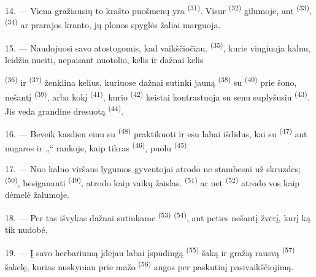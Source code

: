 14. --- Viena gražiausių to krašto puošmenų yra  \textsuperscript{(31)}.
Visur  \textsuperscript{(32)} gilumoje, ant 
\textsuperscript{(33)},  \textsuperscript{(34)} ar prarajos kranto, jų
plonos spyglės žaliai marguoja.

\VUsaut{3.0mm}
\VUsaut{3.0mm}

15. --- Naudojuosi savo atostogomis, kad  vaikščiočiau.
 \textsuperscript{(35)}, kurie vingiuoja kalnu, leidžia nueiti,
nepaisant nuotolio, kelis  ir dažnai kelis 

 \textsuperscript{(36)} ir 
\textsuperscript{(37)} ženklina kelius, kuriuose dažnai sutinki jauną
 \textsuperscript{(38)} su 
\textsuperscript{(40)} prie šono, nešantį  \textsuperscript{(39)},
arba kokį  \textsuperscript{(41)}, kurio 
\textsuperscript{(42)} keistai kontrastuoja su senu suplyšusiu 
\textsuperscript{(43)}. Jis veda grandine dresuotą 
\textsuperscript{(44)}.

\VUsaut{3.0mm}

16. --- Beveik kasdien einu su  \textsuperscript{(48)} praktikuoti
 ir esu labai išdidus, kai su 
\textsuperscript{(47)} ant nugaros ir „“ rankoje, kaip tikras
 \textsuperscript{(46)}, puolu  \textsuperscript{(45)}.

17. --- Nuo kalno viršaus lygumos gyventojai atrodo ne stambesni už skruzdes;
 \textsuperscript{(50)}, besigananti 
\textsuperscript{(49)}, atrodo kaip vaikų žaislas. 
\textsuperscript{(51)} ar net  \textsuperscript{(52)} atrodo
vos kaip dėmelė žalumoje.

18. --- Per tas išvykas dažnai sutinkame  \textsuperscript{(53)}
 \textsuperscript{(54)}, ant peties nešantį žvėrį, kurį ką
tik nudobė.

19. --- Į savo herbariumą įdėjau labai įspūdingą 
\textsuperscript{(55)} šaką ir gražią rausvą  \textsuperscript{(57)}
šakelę, kurias nuskyniau prie mažo  \textsuperscript{(56)} angos per
paskutinį pasivaikščiojimą.

